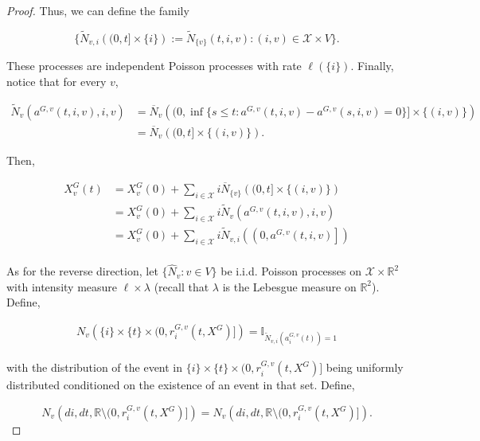 \documentclass[12pt]{article}
\newcommand{\mb}{\mathbb}
\newcommand{\mc}{\mathcal}
\newcommand{\ov}{\overline}
\newcommand{\defeq}{:=}								%
\newcommand{\sta}{\mc{X}}							%
\newcommand{\Xf}{X}									%
\newcommand{\poiss}{N}								%
\newcommand{\leb}{\lambda}							%
\newcommand{\Sm}{\ell}								%
\newcommand{\rate}{r}								%
\newcommand{\poissv}[1]{_{#1}}						%
\newcommand{\vind}[1]{_{#1}}						%
\newcommand{\tme}[1]{(#1)}							%
\newcommand{\gind}[1]{^{#1}}						%
\newcommand{\stpara}[1]{_{#1}}						%
\newcommand{\gvpara}[2]{^{#1,#2}}					%
\newcommand{\tmepro}[2]{(#1,#2)}					%
\newcommand{\compen}{a}								%
\newcommand{\alt}[1]{\tilde{#1}}					%
\begin{document}
\begin{proof}
Thus, we can define the family 

\[\{\alt{\poiss}\poissv{v,i}\left((0,t]\times\{i\}\right) \defeq \alt{\poiss}\poissv{\{v\}}(t,i,v): (i,v) \in \sta\times V\}.\]

These processes are independent Poisson processes with rate \(\Sm(\{i\})\). Finally, notice that for every \(v\), 

\begin{align*}
\alt{\poiss}\vind{v}(\compen\gvpara{G}{v}(t,i,v),i,v) &= \ov{\poiss}\vind{v}\left((0,\inf\{s \leq t: \compen\gvpara{G}{v}(t,i,v) - \compen\gvpara{G}{v}(s,i,v) = 0\}]\times\{(i,v)\}\right)\\
&= \ov{\poiss}\vind{v}\left((0,t]\times\{(i,v)\}\right).
\end{align*}

Then,

\begin{align*}
\Xf\gind{G}\vind{v}\tme{t} &= \Xf\gind{G}\vind{v}\tme{0} + \sum_{i \in \sta} i \ov{\poiss}\poissv{\{v\}}\left((0,t]\times\{(i,v)\}\right)\\
&= \Xf\gind{G}\vind{v}\tme{0} + \sum_{i \in \sta} i\alt{\poiss}\poissv{v}(\compen\gvpara{G}{v}(t,i,v),i,v)\\
&= \Xf\gind{G}\vind{v}\tme{0} + \sum_{i \in \sta} i\alt{\poiss}\poissv{v,i}\left(\left(0,\compen\gvpara{G}{v}(t,i,v)\right]\right)\\
\end{align*}

As for the reverse direction, let \(\{\hat{\poiss}\poissv{v}:v\in V\}\) be i.i.d. Poisson processes on \(\sta\times \mb{R}^2\) with intensity measure \(\Sm\times\leb\) (recall that \(\leb\) is the Lebesgue measure on \(\mb{R}^2\)). Define,

\begin{align*}
\poiss\poissv{v}\left(\{i\}\times \{t\}\times (0,\rate\gvpara{G}{v}\stpara{i}\tmepro{t}{\Xf\gind{G}}]\right) = \mb{I}_{\alt{\poiss}\poissv{v,i}\left(\compen\gvpara{G}{v}\stpara{i}\tme{t}\right)=1}
\end{align*}

with the distribution of the event in \(\{i\}\times \{t\}\times (0,\rate\gvpara{G}{v}\stpara{i}\tmepro{t}{\Xf\gind{G}}]\) being uniformly distributed conditioned on the existence of an event in that set. Define,

\[\poiss\poissv{v}\left(di, dt,\mb{R}\setminus(0,\rate\gvpara{G}{v}\stpara{i}\tmepro{t}{\Xf\gind{G}}]\right) = \hat{\poiss}\poissv{v}\left(di, dt,\mb{R}\setminus(0,\rate\gvpara{G}{v}\stpara{i}\tmepro{t}{\Xf\gind{G}}]\right).\]


\end{proof}
\end{document}
